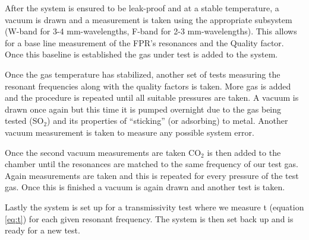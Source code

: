 After the system is ensured to be leak-proof and at a stable temperature, a vacuum is drawn and a measurement is taken using the appropriate subsystem (W-band for 3-4 mm-wavelengths, F-band for 2-3 mm-wavelengths). This allows for a base line measurement of the FPR's resonances and the Quality factor. Once this baseline is established the gas under test is added to the system.

Once the gas temperature has stabilized, another set of tests measuring the resonant frequencies along with the quality factors is taken. More gas is added and the procedure is repeated until all suitable pressures are taken. A vacuum is drawn once again but this time it is pumped overnight due to the gas being tested (SO$_2$) and its properties of ``sticking'' (or adsorbing) to metal. Another vacuum measurement is taken to measure any possible system error.

Once the second vacuum measurements are taken CO$_2$ is then added to the chamber until the resonances are matched to the same frequency of our test gas. Again measurements are taken and this is repeated for every pressure of the test gas. Once this is finished a vacuum is again drawn and another test is taken. 

Lastly the system is set up for a transmissivity test where we measure t (equation \ref{eq:t}) for each given resonant frequency. The system is then set back up and is ready for a new test. %

